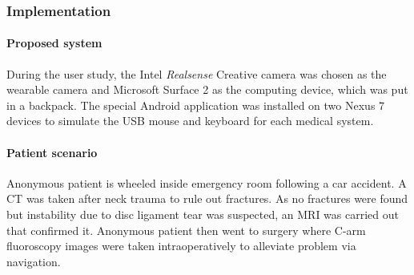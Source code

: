 {\subsubsection{Implementation}
\paragraph{Proposed system}
During the user study, the Intel \textit{Realsense} Creative camera was chosen as the wearable camera and Microsoft Surface 2 as the computing device, which was put in a backpack. The special Android application was installed on two Nexus 7 devices to simulate the USB mouse and keyboard for each medical system. 
\paragraph{Patient scenario}Anonymous patient is wheeled inside emergency room following a car accident. A CT was taken after neck trauma to rule out fractures. As no fractures were found but instability due to disc ligament tear was suspected, an MRI was carried out that confirmed it. Anonymous patient then went to surgery where C-arm fluoroscopy images were taken intraoperatively to alleviate problem via navigation.
}
